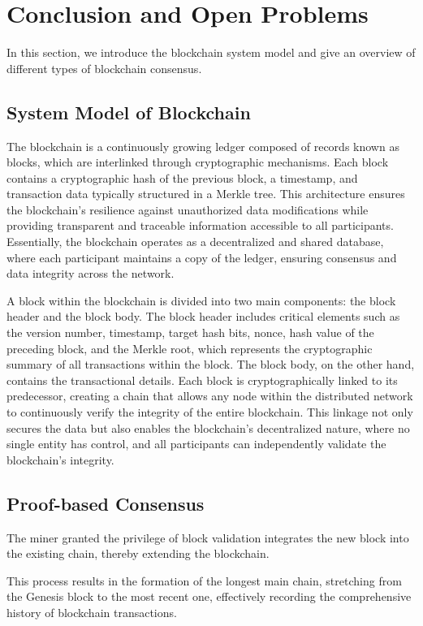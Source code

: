 \section{Conclusion and Open Problems}

In this section, we introduce the blockchain system model and give an overview of different types of blockchain consensus.

\subsection{System Model of Blockchain}
The blockchain is a continuously growing ledger composed of records known as blocks, which are interlinked through cryptographic mechanisms. 
Each block contains a cryptographic hash of the previous block, a timestamp, and transaction data typically structured in a Merkle tree. 
This architecture ensures the blockchain's resilience against unauthorized data modifications while providing transparent and traceable information accessible to all participants. 
Essentially, the blockchain operates as a decentralized and shared database, where each participant maintains a copy of the ledger, ensuring consensus and data integrity across the network.

A block within the blockchain is divided into two main components: the block header and the block body. 
The block header includes critical elements such as the version number, timestamp, target hash bits, nonce, hash value of the preceding block, and the Merkle root, which represents the cryptographic summary of all transactions within the block. 
The block body, on the other hand, contains the transactional details. Each block is cryptographically linked to its predecessor, creating a chain that allows any node within the distributed network to continuously verify the integrity of the entire blockchain. 
This linkage not only secures the data but also enables the blockchain's decentralized nature, where no single entity has control, and all participants can independently validate the blockchain's integrity.

\subsection{Proof-based Consensus}

The miner granted the privilege of block validation integrates the new block into the existing chain, thereby extending the blockchain. 

This process results in the formation of the longest main chain, stretching from the Genesis block to the most recent one, effectively recording the comprehensive history of blockchain transactions.

